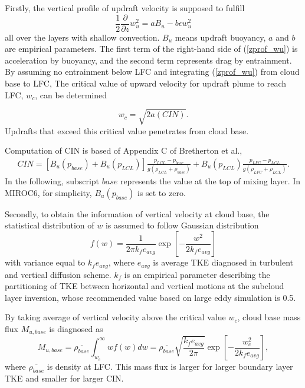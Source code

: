 Firstly, the vertical profile of updraft velocity is supposed to fulfill 
\begin{equation}\label{zprof_wu}
    \frac{1}{2}\frac{\partial}{\partial z}w_u^2=aB_u-b\epsilon w_u^2
\end{equation}
all over the layers with shallow convection. $B_u$ means updraft buoyancy, $a$ and $b$ are empirical parameters. 
The first term of the right-hand side of (\ref{zprof_wu}) is acceleration by buoyancy, and the second term represents drag by entrainment.
By assuming no entrainment below LFC and integrating (\ref{zprof_wu}) from cloud base to LFC, The critical value of upward velocity for updraft plume to reach LFC, $w_c$, can be determined

\begin{equation}\label{wc}
    w_c = \sqrt{2a(CIN)}.
\end{equation}
Updrafts that exceed this critical value penetrates from cloud base.

Computation of CIN is based of Appendix C of Bretherton et al., 
\begin{align}\label{def_CIN}
    CIN = [B_u(p_{base}) + B_u(p_{LCL})]\frac{p_{LCL}-p_{base}}{g(\rho_{LCL}+\rho_{base})} + B_u(p_{LCL})\frac{p_{LFC}-p_{LCL}}{g(\rho_{LFC}+\rho_{LCL})}.
\end{align}
In the following, subscript $\mathit{base}$ represents the value at the top of mixing layer. 
In MIROC6, for simplicity, $B_u(p_{base})$ is set to zero.

Secondly, to obtain the information of vertical velocity at cloud base, the statistical distribution of $w$ is assumed to follow Gaussian distribution
\begin{equation}\label{distr_w}
    f(w) = \frac{1}{2\pi k_f e_{avg}}\exp\left[ -\frac{w^2}{2k_fe_{avg}}\right]
\end{equation}
with variance equal to $k_f e_{avg}$, where $e_{avg}$ is average TKE diagnosed in turbulent and vertical diffusion scheme.
$k_f$ is an empirical parameter describing the partitioning of TKE between horizontal and vertical motions at the subcloud layer inversion, whose recommended value based on large eddy simulation is 0.5.

By taking average of vertical velocity above the critical value $w_c$, cloud base mass flux $M_{u,base}$ is diagnosed as
\begin{equation}\label{Mubase}
    M_{u,base}=\overline{\rho_{base}}\int_{w_c}^{\infty}wf(w)dw =\overline{\rho_{base}}\sqrt{\frac{k_f e_{avg}}{2\pi}}\exp\left[-\frac{w_c^2}{2k_fe_{avg}}\right],
\end{equation}
where $\overline{\rho_{base}}$ is density at LFC.
This mass flux is larger for larger boundary layer TKE and smaller for larger CIN.

